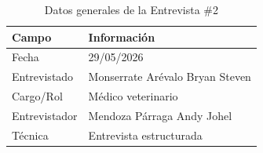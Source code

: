 \documentclass[journal,onecolumn]{IEEEtran}
\begin{document}
\begin{table}[H]
\caption{Datos generales de la Entrevista \#2}
\label{tab:datos_e2}
\begin{tabularx}{\textwidth}{|p{4cm}|X|}
\hline
\textbf{Campo} & \textbf{Información} \\
\hline
Fecha & 29/05/2026 \\
\hline
Entrevistado & Monserrate Arévalo Bryan Steven \\
\hline
Cargo/Rol & Médico veterinario \\
\hline
Entrevistador & Mendoza Párraga Andy Johel \\
\hline
Técnica & Entrevista estructurada \\
\hline
\end{tabularx}
\end{table}
\end{document}
